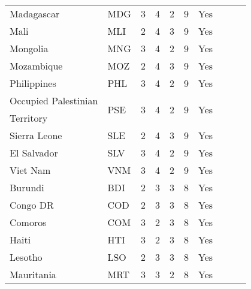 \begin{singlespace}
{\begin{longtable}{l l c c c c c c c c}
Madagascar                 & MDG           & 3          & 4                   & 2         & 9                 & Yes             \\
Mali                       & MLI           & 2          & 4                   & 3         & 9                 & Yes             \\
Mongolia                   & MNG           & 3          & 4                   & 2         & 9                 & Yes             \\
Mozambique                 & MOZ           & 2          & 4                   & 3         & 9                 & Yes             \\
Philippines                & PHL           & 3          & 4                   & 2         & 9                 & Yes             \\
Occupied Palestinian & \multirow{2}{*}{PSE}           & \multirow{2}{*}{3}          & \multirow{2}{*}{4}                   & \multirow{2}{*}{2}         & \multirow{2}{*}{9}                 & \multirow{2}{*}{Yes}             \\
Territory \\
Sierra Leone               & SLE           & 2          & 4                   & 3         & 9                 & Yes             \\
El Salvador                & SLV           & 3          & 4                   & 2         & 9                 & Yes             \\
Viet Nam                   & VNM           & 3          & 4                   & 2         & 9                 & Yes             \\
Burundi                    & BDI           & 2          & 3                   & 3         & 8                 & Yes             \\
Congo DR                   & COD           & 2          & 3                   & 3         & 8                 & Yes             \\
Comoros                    & COM           & 3          & 2                   & 3         & 8                 & Yes             \\
Haiti                      & HTI           & 3          & 2                   & 3         & 8                 & Yes             \\
Lesotho                    & LSO           & 2          & 3                   & 3         & 8                 & Yes             \\
Mauritania                 & MRT           & 3          & 3                   & 2         & 8                 & Yes             \\

\end{longtable}}
\end{singlespace}
